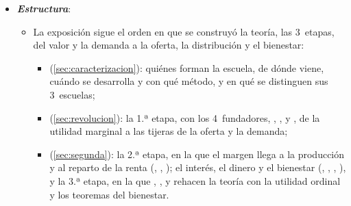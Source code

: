 \documentclass[11pt]{article}
\begin{document}
\begin{itemize}
\item \textbf{\emph{Estructura}}:
  \begin{itemize}
  \item La exposición sigue el orden en que se construyó la teoría, las 3~etapas, del valor y la demanda a la oferta, la distribución y el bienestar:
  \begin{itemize}
  \item {} (\ref{sec:caracterizacion}): quiénes forman la escuela, de dónde viene, cuándo se desarrolla y con qué método, y en qué se distinguen sus 3~escuelas;
  \item {} (\ref{sec:revolucion}): la 1.ª etapa, con los 4~fundadores, , ,  y , de la utilidad marginal a las tijeras de la oferta y la demanda;
  \item {} (\ref{sec:segunda}): la 2.ª etapa, en la que el margen llega a la producción y al reparto de la renta (, , ); el interés, el dinero y el bienestar (, , , ), y la 3.ª etapa, en la que , ,  y  rehacen la teoría con la utilidad ordinal y los teoremas del bienestar.
  \end{itemize}
  \end{itemize}
\end{itemize}
\end{document}
